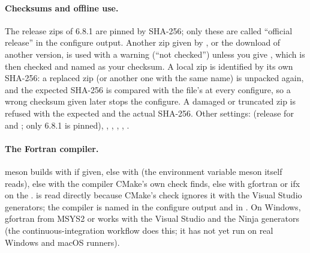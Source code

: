 \paragraph{Checksums and offline use.} The release zips of 6.8.1 are pinned by SHA-256; only these are called ``official
release'' in the configure output. Another zip given by , or the download of another version, is used
with a warning (``not checked'') unless you give , which is then checked and named as
your checksum. A local zip is identified by its own SHA-256: a replaced zip (or another one with the same name) is
unpacked again, and the expected SHA-256 is compared with the file's at every configure, so a wrong checksum given later
stops the configure. A damaged or truncated zip is refused with the expected and the actual SHA-256.
Other settings:  (release for  and ; only 6.8.1 is pinned),
, , , ,
.

\paragraph{The Fortran compiler.} meson builds with  if given, else with  (the
environment variable meson itself reads), else with the compiler CMake's own check finds, else with gfortran or ifx on
the .  is read directly because CMake's check ignores it with the Visual Studio generators; the
compiler is named in the configure output and in . On Windows, gfortran from MSYS2 or
 works with the Visual Studio and the Ninja generators (the continuous-integration
workflow  does this; it has not yet run on real Windows and macOS runners).

